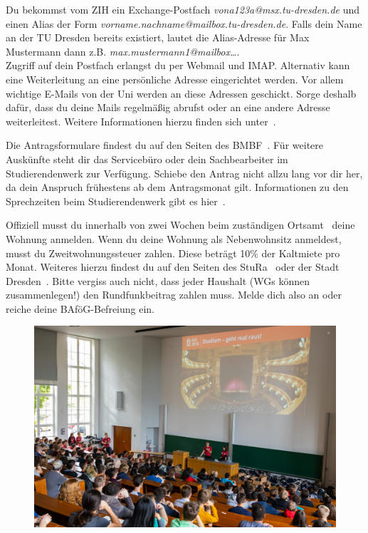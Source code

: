 \begin{itemize}[leftmargin=*]
Du bekommst vom ZIH ein Exchange-Postfach \textit{vona123a@msx.tu-dresden.de}
und einen Alias der Form \textit{vorname.nachname@mailbox.tu-dresden.de}.
Falls dein Name an der TU Dresden bereits existiert,
lautet die Alias-Adresse für Max Mustermann dann z.B.
\textit{max.mustermann1@mailbox…}. \\
Zugriff auf dein Postfach erlangst du per Webmail und IMAP\@. Alternativ kann eine
Weiterleitung an eine persönliche Adresse eingerichtet werden. Vor allem
wichtige E-Mails von der Uni werden an diese Adressen geschickt. Sorge deshalb
dafür, dass du deine Mails regelmäßig abrufst oder an eine andere Adresse
weiterleitest. Weitere Informationen hierzu finden sich unter~.

Die Antragsformulare findest du auf den Seiten des BMBF~. Für weitere
Auskünfte steht dir das Servicebüro oder dein Sachbearbeiter im
Studierendenwerk zur Verfügung. Schiebe den Antrag nicht allzu lang vor dir
her, da dein Anspruch frühestens ab dem Antragsmonat gilt. Informationen zu den
Sprechzeiten beim Studierendenwerk gibt es hier~.

\label{sec:ummelden}
Offiziell musst du innerhalb von zwei Wochen beim zuständigen Ortsamt~
deine Wohnung anmelden. Wenn du deine Wohnung als Nebenwohnsitz anmeldest, musst du
Zweitwohnungssteuer zahlen. Diese beträgt 10\% der Kaltmiete pro Monat.
Weiteres hierzu findest du auf den Seiten des StuRa~ oder der Stadt
Dresden~.
Bitte vergiss auch nicht, dass jeder Haushalt (WGs können zusammenlegen!) den Rundfunkbeitrag
zahlen muss. Melde dich also an oder reiche deine BAföG-Befreiung ein.

\begin{figure}[b!]
\centering
\includegraphics[width=.93\linewidth]{img/ese2018/begruessung.jpg}
\end{figure}


\end{itemize}
